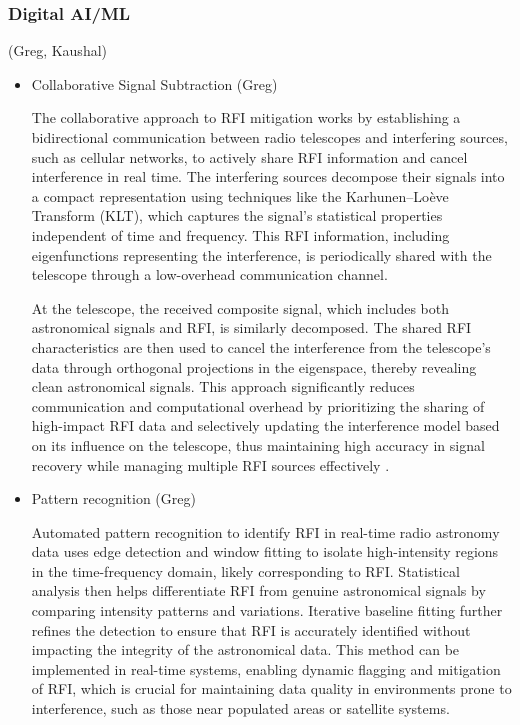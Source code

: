 \subsubsection{Digital AI/ML} (Greg, Kaushal)
\begin{itemize}
\item Collaborative Signal Subtraction (Greg)

The collaborative approach to RFI mitigation works by establishing a bidirectional communication between radio telescopes and interfering sources, such as cellular networks, to actively share RFI information and cancel interference in real time. The interfering sources decompose their signals into a compact representation using techniques like the Karhunen–Loève Transform (KLT), which captures the signal's statistical properties independent of time and frequency. This RFI information, including eigenfunctions representing the interference, is periodically shared with the telescope through a low-overhead communication channel.

At the telescope, the received composite signal, which includes both astronomical signals and RFI, is similarly decomposed. The shared RFI characteristics are then used to cancel the interference from the telescope’s data through orthogonal projections in the eigenspace, thereby revealing clean astronomical signals. This approach significantly reduces communication and computational overhead by prioritizing the sharing of high-impact RFI data and selectively updating the interference model based on its influence on the telescope, thus maintaining high accuracy in signal recovery while managing multiple RFI sources effectively \cite{chakraborty2023collaboration,chakraborty2024low}.

\item Pattern recognition (Greg)

Automated pattern recognition to identify RFI in real-time radio astronomy data \cite{Winkel_2007} uses edge detection and window fitting to isolate high-intensity regions in the time-frequency domain, likely corresponding to RFI. Statistical analysis then helps differentiate RFI from genuine astronomical signals by comparing intensity patterns and variations. Iterative baseline fitting further refines the detection to ensure that RFI is accurately identified without impacting the integrity of the astronomical data. This method can be implemented in real-time systems, enabling dynamic flagging and mitigation of RFI, which is crucial for maintaining data quality in environments prone to interference, such as those near populated areas or satellite systems.


\end{itemize}
